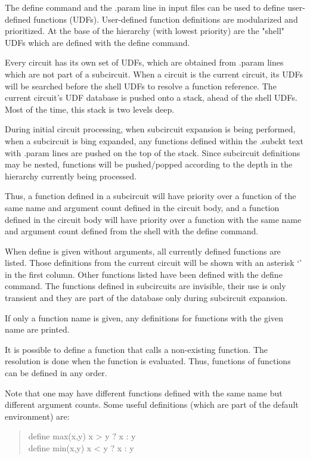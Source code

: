 The {\cb define} command and the {\vt .param} line in input files can
be used to define user-defined functions (UDFs).  User-defined
function definitions are modularized and prioritized.  At the base of
the hierarchy (with lowest priority) are the "shell" UDFs which are
defined with the {\cb define} command.

Every circuit has its own set of UDFs, which are obtained from {\vt
.param} lines which are not part of a subcircuit.  When a circuit is
the current circuit, its UDFs will be searched before the shell UDFs
to resolve a function reference.  The current circuit's UDF database
is pushed onto a stack, ahead of the shell UDFs.  Most of the time,
this stack is two levels deep.

During initial circuit processing, when subcircuit expansion is being
performed, when a subcircuit is bing expanded, any functions defined
within the {\vt .subckt} text with {\vt .param} lines are pushed on
the top of the stack.  Since subcircuit definitions may be nested,
functions will be pushed/popped according to the depth in the
hierarchy currently being processed.
  
Thus, a function defined in a subcircuit will have priority over a
function of the same name and argument count defined in the circuit
body, and a function defined in the circuit body will have priority
over a function with the same name and argument count defined from the
shell with the {\cb define} command.

When {\cb define} is given without arguments, all currently defined
functions are listed.  Those definitions from the current circuit will
be shown with an asterisk `{\vt *}' in the first column.  Other
functions listed have been defined with the {\cb define} command.  The
functions defined in subcircuits are invisible, their use is only
transient and they are part of the database only during subcircuit
expansion.

If only a function name is given, any definitions for functions with
the given name are printed.

It is possible to define a function that calls a non-existing
function.  The resolution is done when the function is evaluated. 
Thus, functions of functions can be defined in any order.

Note that one may have different functions defined with the same name
but different argument counts.  Some useful definitions (which are
part of the default environment) are:
\begin{quote} \vt
define max(x,y) x > y ? x : y\\
define min(x,y) x < y ? x : y
\end{quote}

